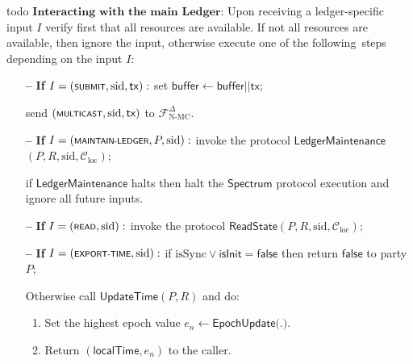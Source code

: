 \begin{protocol}
\begin{algorithmic}
        todo
        \State $\textbf{Interacting with the main Ledger:}$
        Upon receiving a ledger-specific input $I$ verify first that all resources are available.
        If not all resources are available, then ignore the input, otherwise execute one of the following\
        steps depending on the input $I$:
        \begin{itemize}
            \item[\textbf{--}] \textbf{If} $I = (\textsf{\scriptsize{SUBMIT}}, \text{sid}, \textsf{tx}):$ set $\textsf{buffer} \leftarrow \textsf{buffer} || \textsf{tx}$;
            \item [] send $(\textsf{\scriptsize{MULTICAST}}, \text{sid}, \textsf{tx})$ to $\mathcal{F}^{\Delta}_{\text{N-MC}}$.
            \item[\textbf{--}] \textbf{If} $I = (\textsf{\scriptsize{MAINTAIN-LEDGER}}, P, \text{sid}):$ invoke the protocol \hyperref[apndx:main-ledger-protocol]{$\textsf{LedgerMaintenance}$}$(P, R, \text{sid}, \mathcal{C}_{\text{loc}})$;
            \item[] if $\textsf{LedgerMaintenance}$ halts then halt the $\textsf{Spectrum}$ protocol execution and ignore all future inputs.
            \item[\textbf{--}] \textbf{If} $I = (\textsf{\scriptsize{READ}}, \text{sid}):$ invoke the protocol \hyperref[apndx:read-state-protocol]{$\textsf{ReadState}$}$(P, R, \text{sid}, \mathcal{C}_{\text{loc}})$;
            \item[\textbf{--}] \textbf{If} $I = (\textsf{\scriptsize{EXPORT-TIME}}, \text{sid}):$ if $\text{isSync} \vee \textsf{isInit} = \textsf{false}$ then return $\textsf{false}$ to party $P$;
            \item[] Otherwise call \hyperref[apndx:update-time-protocol]{$\textsf{UpdateTime}$}$(P, R)$ and do:
            \begin{enumerate}
                \item Set the highest epoch value $e_n \leftarrow \textsf{EpochUpdate(.)}$.
                \item Return $(\textsf{localTime}, e_n)$ to the caller.
            \end{enumerate}
        \end{itemize}


\end{algorithmic}
\end{protocol}
